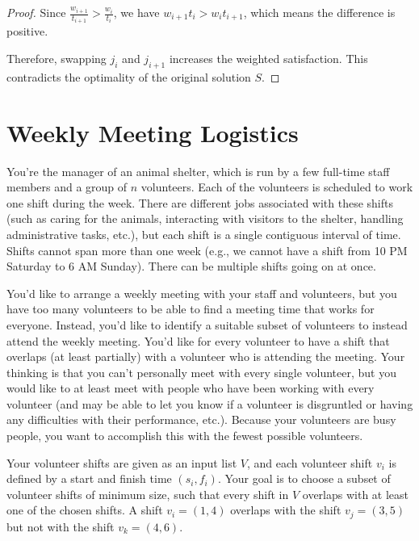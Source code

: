 \documentclass[11pt,fleqn]{exam}
\newenvironment{soln}{\color{solnblue}}{}
\begin{document}
\begin{questions}
\begin{soln}
\begin{proof}
            Since $\frac{w_{i+1}}{t_{i+1}} > \frac{w_i}{t_i}$, we have $w_{i+1}t_i > w_it_{i+1}$, which means the difference is positive.

            Therefore, swapping $j_i$ and $j_{i+1}$ increases the weighted satisfaction. This contradicts the optimality of the original solution $S$. 
        \end{proof}
     \end{soln}

\end{questions}
\section{Weekly Meeting Logistics}

You're the manager of an animal shelter, which is run by a few full-time staff members and a group of $n$ volunteers. Each of the volunteers is scheduled to work one shift during the week. There are different jobs associated with these shifts (such as caring for the animals, interacting with visitors to the shelter, handling administrative tasks, etc.), but each shift is a single contiguous interval of time. Shifts cannot span more than one week (e.g., we cannot have a shift from 10 PM Saturday to 6 AM Sunday). There can be multiple shifts going on at once.

You'd like to arrange a weekly meeting with your staff and volunteers, but you have too many volunteers to be able to find a meeting time that works for everyone. Instead, you'd like to identify a suitable subset of volunteers to instead attend the weekly meeting. You'd like for every volunteer to have a shift that overlaps (at least partially) with a volunteer who is attending the meeting. Your thinking is that you can't personally meet with every single volunteer, but you would like to at least meet with people who have been working with every volunteer (and may be able to let you know if a volunteer is disgruntled or having any difficulties with their performance, etc.). Because your volunteers are busy people, you want to accomplish this with the fewest possible volunteers.

Your volunteer shifts are given as an input list $V$, and each volunteer shift $v_i$ is defined by a start and finish time $(s_i, f_i)$. Your goal is to choose a subset of volunteer shifts of minimum size, such that every shift in $V$ overlaps with at least one of the chosen shifts. A shift $v_i=(1,4)$ overlaps with the shift $v_j=(3,5)$ but not with the shift $v_k=(4,6)$. 
\end{document}

